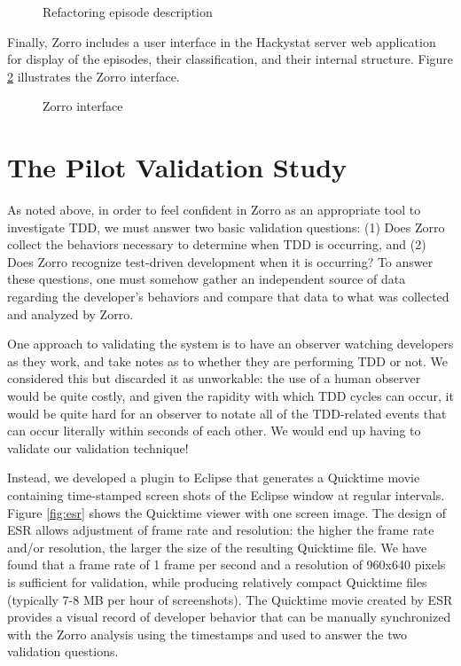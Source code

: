 \documentclass[runningheads]{llncs}
\begin{document}
\begin{figure}[t] 
  \centering
  \caption{Refactoring episode description}
  \label{fig:Refactoring-Microprocess}
\end{figure} 

Finally, Zorro includes a user interface in the Hackystat server web
application for display of the episodes, their classification, and their
internal structure.  Figure \ref{fig:zorro-interface} illustrates the
Zorro interface. 

\begin{figure}[t] 
  \centering
  \caption{Zorro interface}
  \label{fig:zorro-interface}
\end{figure} 


\section{The Pilot Validation Study}
\label{sec:casestudy}

As noted above, in order to feel confident in Zorro as an appropriate tool
to investigate TDD, we must answer two basic validation questions: (1) Does
Zorro collect the behaviors necessary to determine when TDD is occurring,
and (2) Does Zorro recognize test-driven development when it is occurring?
To answer these questions, one must somehow gather an independent source of
data regarding the developer's behaviors and compare that data to what was
collected and analyzed by Zorro.

One approach to validating the system is to have an observer watching
developers as they work, and take notes as to whether they are performing
TDD or not.  We considered this but discarded it as unworkable: the use of
a human observer would be quite costly, and given the rapidity with which
TDD cycles can occur, it would be quite hard for an observer to notate all
of the TDD-related events that can occur literally within seconds of each
other. We would end up having to validate our validation technique!

Instead, we developed a plugin to Eclipse that generates a Quicktime movie
containing time-stamped screen shots of the Eclipse window at regular
intervals.  Figure \ref{fig:esr} shows the Quicktime viewer with one screen
image.  The design of ESR allows adjustment of frame rate and resolution:
the higher the frame rate and/or resolution, the larger the size of the
resulting Quicktime file. We have found that a frame rate of 1 frame per
second and a resolution of 960x640 pixels is sufficient for validation,
while producing relatively compact Quicktime files (typically 7-8 MB per
hour of screenshots).  The Quicktime movie created by ESR provides a visual
record of developer behavior that can be manually synchronized with the
Zorro analysis using the timestamps and used to answer the two validation
questions.
\end{document}
